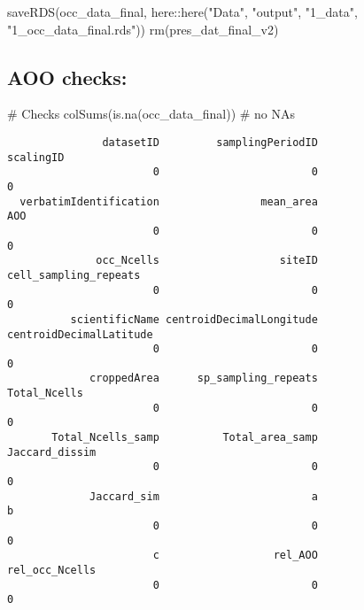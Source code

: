 \documentclass[
  letterpaper,
  DIV=11,
  numbers=noendperiod]{scrreprt}
\newenvironment{Shaded}{\begin{snugshade}}{\end{snugshade}}
\newcommand{\CommentTok}[1]{\textcolor[rgb]{0.37,0.37,0.37}{#1}}
\newcommand{\FunctionTok}[1]{\textcolor[rgb]{0.28,0.35,0.67}{#1}}
\newcommand{\NormalTok}[1]{\textcolor[rgb]{0.00,0.23,0.31}{#1}}
\newcommand{\SpecialCharTok}[1]{\textcolor[rgb]{0.37,0.37,0.37}{#1}}
\newcommand{\StringTok}[1]{\textcolor[rgb]{0.13,0.47,0.30}{#1}}
\begin{document}
\begin{Shaded}
\begin{Highlighting}[]
\FunctionTok{saveRDS}\NormalTok{(occ\_data\_final, here}\SpecialCharTok{::}\FunctionTok{here}\NormalTok{(}\StringTok{"Data"}\NormalTok{, }\StringTok{"output"}\NormalTok{, }\StringTok{"1\_data"}\NormalTok{, }\StringTok{"1\_occ\_data\_final.rds"}\NormalTok{))}
\FunctionTok{rm}\NormalTok{(pres\_dat\_final\_v2)}
\end{Highlighting}
\end{Shaded}

\hypertarget{aoo-checks}{%
\subsection{AOO checks:}\label{aoo-checks}}

\begin{Shaded}
\begin{Highlighting}[]
\CommentTok{\# Checks}
\FunctionTok{colSums}\NormalTok{(}\FunctionTok{is.na}\NormalTok{(occ\_data\_final)) }\CommentTok{\# no NAs}
\end{Highlighting}
\end{Shaded}

\begin{verbatim}
               datasetID         samplingPeriodID                scalingID
                       0                        0                        0
  verbatimIdentification                mean_area                      AOO
                       0                        0                        0
              occ_Ncells                   siteID    cell_sampling_repeats
                       0                        0                        0
          scientificName centroidDecimalLongitude  centroidDecimalLatitude
                       0                        0                        0
             croppedArea      sp_sampling_repeats             Total_Ncells
                       0                        0                        0
       Total_Ncells_samp          Total_area_samp           Jaccard_dissim
                       0                        0                        0
             Jaccard_sim                        a                        b
                       0                        0                        0
                       c                  rel_AOO           rel_occ_Ncells
                       0                        0                        0
\end{verbatim}
\end{document}
